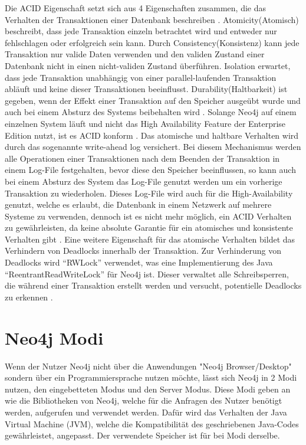 Die ACID Eigenschaft setzt sich aus 4 Eigenschaften zusammen, die das Verhalten der Transaktionen einer  Datenbank beschreiben \parencite{haerder1983principles}. Atomicity(Atomisch) beschreibt, dass jede Transaktion einzeln betrachtet wird und entweder nur fehlschlagen oder erfolgreich sein kann. Durch Consistency(Konsistenz) kann jede Transaktion nur valide Daten verwenden und den validen Zustand einer Datenbank nicht in einen nicht-validen Zustand überführen. Isolation erwartet, dass jede Transaktion unabhängig von einer parallel-laufenden Transaktion abläuft und keine dieser Transaktionen beeinflusst. Durability(Haltbarkeit) ist gegeben, wenn der Effekt einer Transaktion auf den Speicher ausgeübt wurde und auch bei einem Absturz des Systems beibehalten wird \parencite{haerder1983principles}. Solange Neo4j auf einem einzelnen System läuft und nicht das High Availability Feature der Enterprise Edition nutzt, ist es ACID konform \parencite{holzschuher2013performance}. Das atomische und haltbare Verhalten wird durch das sogenannte write-ahead log versichert. Bei diesem Mechanismus  werden alle Operationen einer Transaktionen nach dem Beenden der Transaktion in einem Log-File  festgehalten, bevor diese  den Speicher beeinflussen, so kann auch bei einem Absturz des System das Log-File genutzt werden um ein vorherige Transaktion zu wiederholen.  Dieses Log-File wird auch für die High-Availability  genutzt, welche es erlaubt, die Datenbank in einem Netzwerk auf mehrere Systeme zu verwenden, dennoch ist es nicht mehr möglich, ein  ACID Verhalten zu gewährleisten, da keine absolute Garantie für ein  atomisches und konsistente Verhalten gibt \parencite{vukotic2015neo4j}. Eine weitere Eigenschaft für das atomische Verhalten bildet das Verhindern von Deadlocks innerhalb der Transaktion. Zur Verhinderung von Deadlocks wird “RWLock” verwendet, was eine Implementierung des Java “ReentrantReadWriteLock” für Neo4j ist. Dieser verwaltet alle Schreibsperren, die während einer Transaktion erstellt werden und versucht, potentielle Deadlocks zu erkennen \parencite{raj2015neo4j}.
\section {Neo4j Modi}
Wenn der Nutzer Neo4j nicht über die Anwendungen "Neo4j Browser/Desktop" sondern über ein Programmiersprache nutzen möchte,  lässt sich Neo4j in 2 Modi nutzen, den eingebetteten Modus und den Server Modus. Diese Modi geben an wie die Bibliotheken von Neo4j, welche für die Anfragen des Nutzer benötigt werden, aufgerufen und verwendet werden. Dafür wird das Verhalten der Java Virtual Machine (JVM), welche die Kompatibilität des geschriebenen Java-Codes gewährleistet, angepasst. Der verwendete Speicher ist für bei Modi derselbe.

